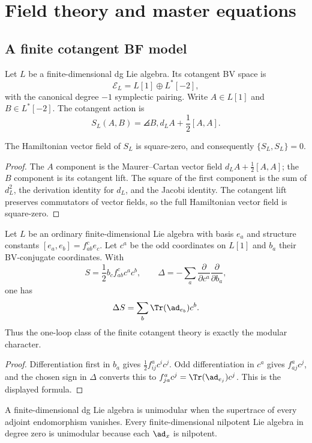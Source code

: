 \part{Field theory and master equations}

\chapter{A finite cotangent BF model}
Let $L$ be a finite-dimensional dg Lie algebra. Its cotangent BV space is
\[
 \mathcal E_L=L[1]\oplus L^*[-2],
\]
with the canonical degree $-1$ symplectic pairing. Write $A\in L[1]$ and $B\in L^*[-2]$. The cotangent action is
\[
 S_L(A,B)=\angles{B,d_LA+\frac12[A,A]}.
\]

\begin{theorem}
The Hamiltonian vector field of $S_L$ is square-zero, and consequently $\{S_L,S_L\}=0$.
\end{theorem}
\begin{proof}
The $A$ component is the Maurer--Cartan vector field $d_LA+\frac12[A,A]$; the $B$ component is its cotangent lift. The square of the first component is the sum of $d_L^2$, the derivation identity for $d_L$, and the Jacobi identity. The cotangent lift preserves commutators of vector fields, so the full Hamiltonian vector field is square-zero.
\end{proof}

\begin{proposition}
Let $L$ be an ordinary finite-dimensional Lie algebra with basis $e_a$ and structure constants $[e_a,e_b]=f^c_{ab}e_c$. Let $c^a$ be the odd coordinates on $L[1]$ and $b_a$ their BV-conjugate coordinates. With
\[
 S=\frac12 b_c f^c_{ab}c^ac^b,
 \qquad
 \Delta=-\sum_a\frac{\partial}{\partial c^a}
                 \frac{\partial}{\partial b_a},
\]
one has
\[
 \Delta S=\sum_b\Tr(\ad_{e_b})c^b.
\]
Thus the one-loop class of the finite cotangent theory is exactly the modular character.
\end{proposition}
\begin{proof}
Differentiation first in $b_a$ gives $\frac12f^a_{ij}c^ic^j$. Odd differentiation in $c^a$ gives $f^a_{aj}c^j$, and the chosen sign in $\Delta$ converts this to $f^a_{ja}c^j=\Tr(\ad_{e_j})c^j$. This is the displayed formula.
\end{proof}

A finite-dimensional dg Lie algebra is unimodular when the supertrace of every adjoint endomorphism vanishes. Every finite-dimensional nilpotent Lie algebra in degree zero is unimodular because each $\ad_x$ is nilpotent.

